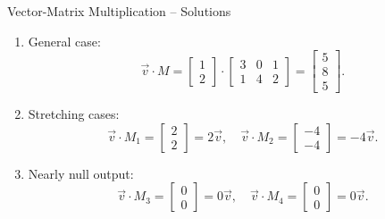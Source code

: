 \documentclass{beamer}
\begin{document}
\begin{frame}{Vector-Matrix Multiplication – Solutions}
  \begin{enumerate}
    \item General case:
    \begin{equation}
    \vec{v} \cdot M = \begin{bmatrix} 1 \\ 2 \end{bmatrix} \cdot
    \begin{bmatrix} 3 & 0 & 1 \\ 1 & 4 & 2 \end{bmatrix}
    = \begin{bmatrix} 5 \\ 8 \\ 5 \end{bmatrix}.
    \end{equation}
    \item Stretching cases:
    \begin{equation}
    \vec{v} \cdot M_1 = \begin{bmatrix} 2 \\ 2 \end{bmatrix}=2\vec{v}, \quad
    \vec{v} \cdot M_2 = \begin{bmatrix} -4 \\ -4 \end{bmatrix} = -4\vec{v}.
    \end{equation}
    \item Nearly null output:
    \begin{equation}
    \vec{v} \cdot M_3 = \begin{bmatrix} 0 \\ 0 \end{bmatrix}=0\vec{v}, \quad
    \vec{v} \cdot M_4 = \begin{bmatrix} 0 \\ 0 \end{bmatrix}=0\vec{v}.
    \end{equation}
  \end{enumerate}
\end{frame}
\end{document}
